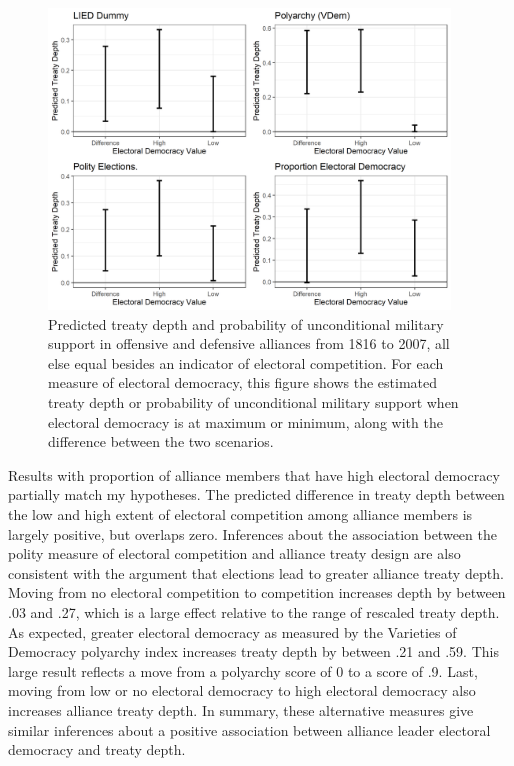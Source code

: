 \documentclass[12pt]{article}
\begin{document}
\begin{figure}[hbtp]
\centering
\includegraphics[width=0.95\textwidth]{results-other-democ.png}
\caption{Predicted treaty depth and probability of unconditional military support in offensive and defensive alliances from 1816 to 2007, all else equal besides an indicator of electoral competition. For each measure of electoral democracy, this figure shows the estimated treaty depth or probability of unconditional military support when electoral democracy is at maximum or minimum, along with the difference between the two scenarios.}
\label{fig:results-other-democ}
\end{figure}


Results with proportion of alliance members that have high electoral democracy partially match my hypotheses.  
The predicted difference in treaty depth between the low and high extent of electoral competition among alliance members is largely positive, but overlaps zero. 
Inferences about the association between the polity measure of electoral competition and alliance treaty design are also consistent with the argument that elections lead to greater alliance treaty depth.
Moving from no electoral competition to competition increases depth by between .03 and .27, which is a large effect relative to the range of rescaled treaty depth. 
As expected, greater electoral democracy as measured by the Varieties of Democracy polyarchy index increases treaty depth by between .21 and .59.
This large result reflects a move from a polyarchy score of 0 to a score of .9. 
Last, moving from low or no electoral democracy to high electoral democracy also increases alliance treaty depth. 
In summary, these alternative measures give similar inferences about a positive association between alliance leader electoral democracy and treaty depth. 
\end{document}
